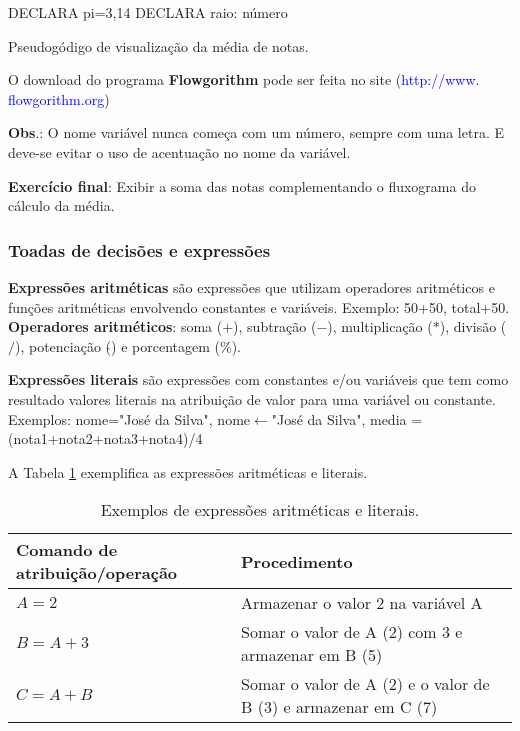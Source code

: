 \documentclass[12pt,a4paper]{article}
\begin{document}
	\begin{algorithm}[!htpb]
		\DontPrintSemicolon
		DECLARA pi=3,14 %
		DECLARA raio: número 
		\caption{Pseudogódigo de visualização da média de notas.}
		\label{algo:DeclaracaoDeConstantes}
	\end{algorithm}

	O download do programa \textbf{Flowgorithm} pode ser feita no site (\textcolor{blue}{http://www. flowgorithm.org})
	
	\textbf{Obs}.: O nome variável nunca começa com um número, sempre com uma letra. E deve-se evitar o uso de acentuação no nome da variável.
	
	\textbf{Exercício final}: Exibir a soma das notas complementando o fluxograma do cálculo da média.
	
	\subsubsection{Toadas de decisões e expressões}
	
	\textbf{Expressões aritméticas} são expressões que utilizam operadores aritméticos e funções aritméticas envolvendo constantes e variáveis. Exemplo: 50+50, total+50. \textbf{Operadores aritméticos}: soma ($+$), subtração ($-$), multiplicação ($*$), divisão ($/$), potenciação ($\hat{}$) e porcentagem ($\%$).
	
	\textbf{Expressões literais} são expressões com constantes e/ou variáveis que tem como resultado valores literais na atribuição de valor para uma variável ou constante. Exemplos: nome="José da Silva", nome$\leftarrow$"José da Silva", media = (nota1+nota2+nota3+nota4)/4
	
	A Tabela \ref{tab:Expressoes} exemplifica as expressões aritméticas e literais.
	
	\begin{table}[!htpb]
		\centering
		\begin{tabular}{|p{}|p{}|}%
			\hline
			Comando de atribuição/operação & Procedimento \\
			\hline
			$A=2$ & Armazenar o valor 2 na variável A \\
			\hline
			$B=A+3$ & Somar o valor de A (2) com 3 e armazenar em B (5) \\
			\hline
			$C=A+B$ & Somar o valor de A (2) e o valor de B (3) e armazenar em C (7) \\
			\hline
		\end{tabular}
	\caption{Exemplos de expressões aritméticas e literais.}
	\label{tab:Expressoes}
	\end{table}
	
\end{document}
